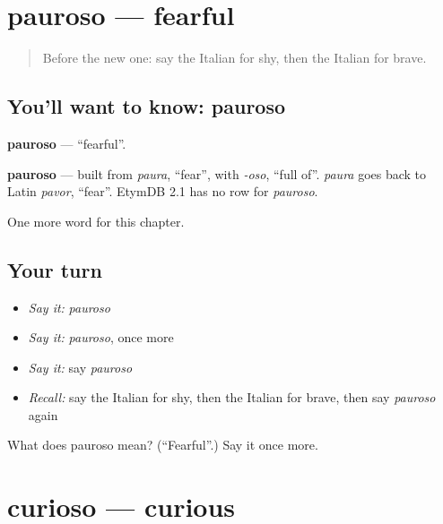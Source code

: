 \section[pauroso]{pauroso — fearful}

\label{lesson:IT-C189-pauroso}



\begin{quote}
Before the new one: say the Italian for shy, then the Italian for brave.
\end{quote}

\subsection*{You'll want to know: pauroso}
\textbf{pauroso} — \textquotedblleft{}fearful\textquotedblright{}.

\begin{cousinweb}
\textbf{pauroso} — built from \emph{paura}, \textquotedblleft{}fear\textquotedblright{}, with \emph{-oso}, \textquotedblleft{}full of\textquotedblright{}. \emph{paura} goes back to Latin \emph{pavor}, \textquotedblleft{}fear\textquotedblright{}. EtymDB 2.1 has no row for \emph{pauroso}.
\end{cousinweb}

\begin{grammarlens}[title={What you've built}]
One more word for this chapter.
\end{grammarlens}

\subsection*{Your turn}
\begin{itemize}
\raggedright
  \item \emph{Say it:} \emph{pauroso}
  \item \emph{Say it:} \emph{pauroso}, once more
  \item \emph{Say it:} say \emph{pauroso}
  \item \emph{Recall:} say the Italian for shy, then the Italian for brave, then say \emph{pauroso} again
\end{itemize}

\begin{tcolorbox}[breakable,colback=teal!4,colframe=teal!35!black,title={Before you move on}]
What does pauroso mean? (\textquotedblleft{}Fearful\textquotedblright{}.) Say it once more.
\end{tcolorbox}
\section[curioso]{curioso — curious}

